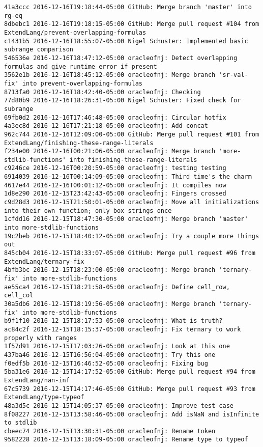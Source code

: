 \begin{lstlisting}
41a3ccc 2016-12-16T19:18:44-05:00 GitHub: Merge branch 'master' into rg-eq
8dbebc1 2016-12-16T19:18:15-05:00 GitHub: Merge pull request #104 from ExtendLang/prevent-overlapping-formulas
c1431b5 2016-12-16T18:55:07-05:00 Nigel Schuster: Implemented basic subrange comparison
546536e 2016-12-16T18:47:12-05:00 oracleofnj: Detect overlapping formulas and give runtime error if present
3562e1b 2016-12-16T18:45:12-05:00 oracleofnj: Merge branch 'sr-val-fix' into prevent-overlapping-formulas
8713fa0 2016-12-16T18:42:40-05:00 oracleofnj: Checking
77d80b9 2016-12-16T18:26:31-05:00 Nigel Schuster: Fixed check for subrange
69fb0d2 2016-12-16T17:46:48-05:00 oracleofnj: Circular hotfix
4a3ec8d 2016-12-16T17:21:18-05:00 oracleofnj: Add concat
962c744 2016-12-16T12:09:00-05:00 GitHub: Merge pull request #101 from ExtendLang/finishing-these-range-literals
f234e00 2016-12-16T00:21:06-05:00 oracleofnj: Merge branch 'more-stdlib-functions' into finishing-these-range-literals
c9246ce 2016-12-16T00:20:59-05:00 oracleofnj: testing testing
6914039 2016-12-16T00:14:09-05:00 oracleofnj: Third time's the charm
4617e44 2016-12-16T00:01:12-05:00 oracleofnj: It compiles now
1d8e290 2016-12-15T23:42:43-05:00 oracleofnj: Fingers crossed
c9d28d3 2016-12-15T21:50:01-05:00 oracleofnj: Move all initializations into their own function; only box strings once
1cfdd16 2016-12-15T18:47:30-05:00 oracleofnj: Merge branch 'master' into more-stdlib-functions
19c2beb 2016-12-15T18:40:12-05:00 oracleofnj: Try a couple more things out
845cb04 2016-12-15T18:33:07-05:00 GitHub: Merge pull request #96 from ExtendLang/ternary-fix
4bfb3bc 2016-12-15T18:23:00-05:00 oracleofnj: Merge branch 'ternary-fix' into more-stdlib-functions
ae55ca4 2016-12-15T18:21:58-05:00 oracleofnj: Define cell_row, cell_col
30a5db6 2016-12-15T18:19:56-05:00 oracleofnj: Merge branch 'ternary-fix' into more-stdlib-functions
b9f1f10 2016-12-15T18:17:53-05:00 oracleofnj: What is truth?
ac84c2f 2016-12-15T18:15:37-05:00 oracleofnj: Fix ternary to work properly with ranges
1f57d91 2016-12-15T17:03:26-05:00 oracleofnj: Look at this one
437ba46 2016-12-15T16:56:04-05:00 oracleofnj: Try this one
f0edf5b 2016-12-15T16:46:52-05:00 oracleofnj: Fixing bug
5ba31e6 2016-12-15T14:17:52-05:00 GitHub: Merge pull request #94 from ExtendLang/nan-inf
67c5739 2016-12-15T14:17:46-05:00 GitHub: Merge pull request #93 from ExtendLang/type-typeof
48a3d5c 2016-12-15T14:05:37-05:00 oracleofnj: Improve test case
8f08227 2016-12-15T13:58:46-05:00 oracleofnj: Add isNaN and isInfinite to stdlib
cbeec74 2016-12-15T13:30:31-05:00 oracleofnj: Rename token
9582228 2016-12-15T13:18:09-05:00 oracleofnj: Rename type to typeof

\end{lstlisting}
